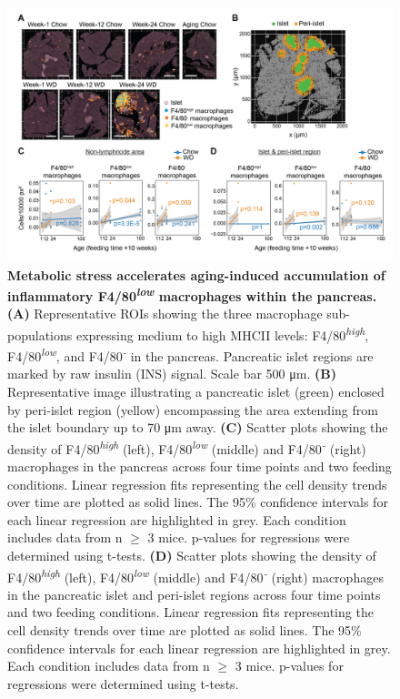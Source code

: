 \begin{figure}[t!]
    \centering
    \includegraphics[width=\linewidth]{Chapter4/Fig/F2-9-01.png}
    \caption[res-imc2]{\textbf{Metabolic stress accelerates aging-induced accumulation of inflammatory F4/80\textsuperscript{\textit{low}} macrophages within the pancreas.} \textbf{(A)} Representative ROIs showing the three macrophage sub-populations expressing medium to high MHCII levels: F4/80\textsuperscript{\textit{high}}, F4/80\textsuperscript{\textit{low}}, and F4/80\textsuperscript{\textit{-}} in the pancreas. Pancreatic islet regions are marked by raw insulin (INS) signal. Scale bar 500 μm. \textbf{(B)} Representative image illustrating a pancreatic islet (green) enclosed by peri-islet region (yellow) encompassing the area extending from the islet boundary up to 70 μm away. \textbf{(C)} Scatter plots showing the density of F4/80\textsuperscript{\textit{high}} (left), F4/80\textsuperscript{\textit{low}} (middle) and F4/80\textsuperscript{\textit{-}} (right) macrophages in the pancreas across four time points and two feeding conditions. Linear regression fits representing the cell density trends over time are plotted as solid lines. The 95\% confidence intervals for each linear regression are highlighted in grey. Each condition includes data from n $\geq$ 3 mice. p-values for regressions were determined using t-tests. \textbf{(D)} Scatter plots showing the density of F4/80\textsuperscript{\textit{high}} (left), F4/80\textsuperscript{\textit{low}} (middle) and F4/80\textsuperscript{\textit{-}} (right) macrophages in the pancreatic islet and peri-islet regions across four time points and two feeding conditions. Linear regression fits representing the cell density trends over time are plotted as solid lines. The 95\% confidence intervals for each linear regression are highlighted in grey. Each condition includes data from n $\geq$ 3 mice. p-values for regressions were determined using t-tests.}
    \label{fig2-9}
\end{figure}

